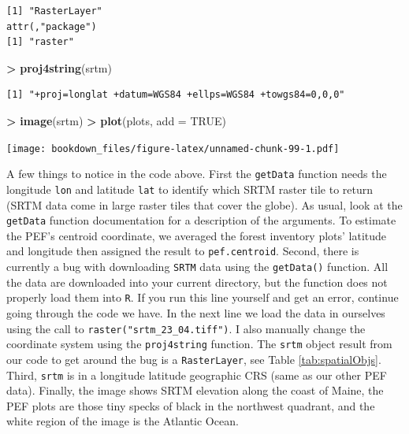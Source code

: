\documentclass[]{krantz}
\makeatletter
\newenvironment{Shaded}{\begin{snugshade}}{\end{snugshade}}
\newcommand{\KeywordTok}[1]{\textcolor[rgb]{0.27,0.27,0.27}{\textbf{#1}}}
\newcommand{\DataTypeTok}[1]{\textcolor[rgb]{0.27,0.27,0.27}{#1}}
\newcommand{\StringTok}[1]{\textcolor[rgb]{0.5,0.5,0.5}{#1}}
\newcommand{\OtherTok}[1]{\textcolor[rgb]{0.37,0.37,0.37}{#1}}
\newcommand{\OperatorTok}[1]{\textcolor[rgb]{0.43,0.43,0.43}{\textbf{#1}}}
\newcommand{\NormalTok}[1]{#1}
\newenvironment{kframe}{%
\medskip{}
\setlength{\fboxsep}{.8em}
 \def\at@end@of@kframe{}%
 \ifinner\ifhmode%
  \def\at@end@of@kframe{\end{minipage}}%
  \begin{minipage}{\columnwidth}%
 \fi\fi%
 \def\FrameCommand##1{\hskip\@totalleftmargin \hskip-\fboxsep
 \colorbox{shadecolor}{##1}\hskip-\fboxsep
     \hskip-\linewidth \hskip-\@totalleftmargin \hskip\columnwidth}%
 \MakeFramed {\advance\hsize-\width
   \@totalleftmargin\z@ \linewidth\hsize
   \@setminipage}}%
 {\par\unskip\endMakeFramed%
 \at@end@of@kframe}
\renewenvironment{Shaded}{\begin{kframe}}{\end{kframe}}
\theoremstyle{definition}
\theoremstyle{definition}
\theoremstyle{definition}
\theoremstyle{remark}
\makeatother
\begin{document}
\begin{verbatim}
[1] "RasterLayer"
attr(,"package")
[1] "raster"
\end{verbatim}

\begin{Shaded}
\begin{Highlighting}[]
\OperatorTok{>}\StringTok{ }\KeywordTok{proj4string}\NormalTok{(srtm)}
\end{Highlighting}
\end{Shaded}

\begin{verbatim}
[1] "+proj=longlat +datum=WGS84 +ellps=WGS84 +towgs84=0,0,0"
\end{verbatim}

\begin{Shaded}
\begin{Highlighting}[]
\OperatorTok{>}\StringTok{ }\KeywordTok{image}\NormalTok{(srtm)}
\OperatorTok{>}\StringTok{ }\KeywordTok{plot}\NormalTok{(plots, }\DataTypeTok{add =} \OtherTok{TRUE}\NormalTok{)}
\end{Highlighting}
\end{Shaded}

\texttt{[image: bookdown\_files/figure-latex/unnamed-chunk-99-1.pdf]}

A few things to notice in the code above. First the \texttt{getData}
function needs the longitude \texttt{lon} and latitude \texttt{lat} to
identify which SRTM raster tile to return (SRTM data come in large
raster tiles that cover the globe). As usual, look at the
\texttt{getData} function documentation for a description of the
arguments. To estimate the PEF's centroid coordinate, we averaged the
forest inventory plots' latitude and longitude then assigned the result
to \texttt{pef.centroid}. Second, there is currently a bug with
downloading \texttt{SRTM} data using the \texttt{getData()} function.
All the data are downloaded into your current directory, but the
function does not properly load them into \texttt{R}. If you run this
line yourself and get an error, continue going through the code we have.
In the next line we load the data in ourselves using the call to
\texttt{raster("srtm\_23\_04.tiff")}. I also manually change the
coordinate system using the \texttt{proj4string} function. The
\texttt{srtm} object result from our code to get around the bug is a
\texttt{RasterLayer}, see Table \ref{tab:spatialObjs}. Third,
\texttt{srtm} is in a longitude latitude geographic CRS (same as our
other PEF data). Finally, the image shows SRTM elevation along the coast
of Maine, the PEF plots are those tiny specks of black in the northwest
quadrant, and the white region of the image is the Atlantic Ocean.
\end{document}
